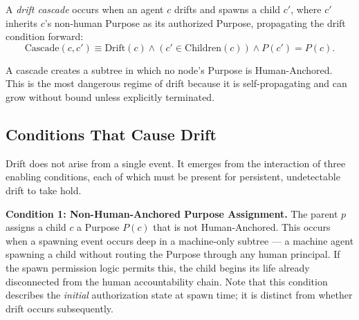 \begin{dfn}
\label{dfn:drift-cascade}
A \textit{drift cascade} occurs when an agent $c$ drifts and spawns a child $c'$, where $c'$ inherits $c$'s non-human Purpose as its authorized Purpose, propagating the drift condition forward:
\[
\text{Cascade}(c, c') \equiv \text{Drift}(c) \land (c' \in \text{Children}(c)) \land P(c') = P(c).
\]
\end{dfn}

A cascade creates a subtree in which no node's Purpose is Human-Anchored. This is the most dangerous regime of drift because it is self-propagating and can grow without bound unless explicitly terminated.

\subsection{Conditions That Cause Drift}

Drift does not arise from a single event. It emerges from the interaction of three enabling conditions, each of which must be present for persistent, undetectable drift to take hold.

\medskip
\noindent\textbf{Condition 1: Non-Human-Anchored Purpose Assignment.}
The parent $p$ assigns a child $c$ a Purpose $P(c)$ that is not Human-Anchored. This occurs when a spawning event occurs deep in a machine-only subtree — a machine agent spawning a child without routing the Purpose through any human principal. If the spawn permission logic permits this, the child begins its life already disconnected from the human accountability chain. Note that this condition describes the \textit{initial} authorization state at spawn time; it is distinct from whether drift occurs subsequently.

